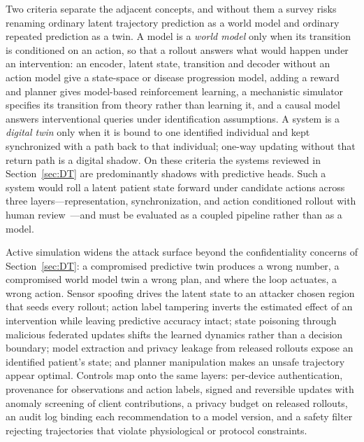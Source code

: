 \documentclass[journal]{IEEEtran}
\begin{document}
Two criteria separate the adjacent concepts, and without them a survey risks renaming ordinary latent trajectory prediction as a world model and ordinary repeated prediction as a twin. A model is a \emph{world model} only when its transition is conditioned on an action, so that a rollout answers what would happen under an intervention: an encoder, latent state, transition and decoder without an action model give a state-space or disease progression model, adding a reward and planner gives model-based reinforcement learning, a mechanistic simulator specifies its transition from theory rather than learning it, and a causal model answers interventional queries under identification assumptions. A system is a \emph{digital twin} only when it is bound to one identified individual and kept synchronized with a path back to that individual; one-way updating without that return path is a digital shadow. On these criteria the systems reviewed in Section~\ref{sec:DT} are predominantly shadows with predictive heads. Such a system would roll a latent patient state forward under candidate actions across three layers---representation, synchronization, and action conditioned rollout with human review~\cite{Sadee2025MedicalDT}---and must be evaluated as a coupled pipeline rather than as a model.

Active simulation widens the attack surface beyond the confidentiality concerns of Section~\ref{sec:DT}: a compromised predictive twin produces a wrong number, a compromised world model twin a wrong plan, and where the loop actuates, a wrong action. Sensor spoofing drives the latent state to an attacker chosen region that seeds every rollout; action label tampering inverts the estimated effect of an intervention while leaving predictive accuracy intact; state poisoning through malicious federated updates shifts the learned dynamics rather than a decision boundary; model extraction and privacy leakage from released rollouts expose an identified patient's state; and planner manipulation makes an unsafe trajectory appear optimal. Controls map onto the same layers: per-device authentication, provenance for observations and action labels, signed and reversible updates with anomaly screening of client contributions, a privacy budget on released rollouts, an audit log binding each recommendation to a model version, and a safety filter rejecting trajectories that violate physiological or protocol constraints.
\end{document}
